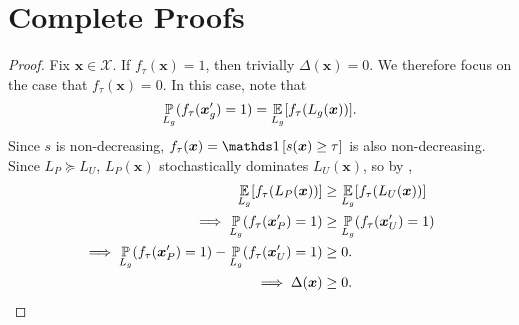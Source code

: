             

\section{Complete Proofs}
    \label{sec: appendix proof}

\theoremOne*
    \begin{proof}
        Fix \(\bm{x} \in \mathcal{X}\). If \(f_\tau(\bm{x}) = 1\), then trivially \(\Delta(\bm{x}) = 0\). We therefore focus on the case that \(f_\tau(\bm{x}) = 0\). In this case, note that
        \begin{equation*}
            \operatorname*{\mathbb{P}}_{L_g}(f_\tau(\bm{x}'_g) = 1) = \operatorname*{\mathbb{E}}_{L_g}[f_\tau(L_g(\bm{x}))]. 
        \end{equation*}
        Since \(s\) is non-decreasing, \(f_\tau(\bm{x}) = \one[s(\bm{x}) \geq \tau]\) is also non-decreasing. Since \(L_P \succeq L_U\), \(L_P(\bm{x})\) stochastically dominates \(L_U(\bm{x})\), so by ,
        \begin{align*}
            \operatorname*{\mathbb{E}}_{L_g}[f_\tau(L_P(\bm{x}))] &\geq \operatorname*{\mathbb{E}}_{L_g}[f_\tau(L_U(\bm{x}))] 
        \\  \implies
            \operatorname*{\mathbb{P}}_{L_g}(f_\tau(\bm{x}'_P) = 1) &\geq 
            \operatorname*{\mathbb{P}}_{L_g}(f_\tau(\bm{x}'_U) = 1)
        \\  \implies
            \operatorname*{\mathbb{P}}_{L_g}(f_\tau(\bm{x}'_P) = 1)- \operatorname*{\mathbb{P}}_{L_g}(f_\tau(\bm{x}'_U) = 1)&\geq 0.
        \\  \implies
            \Delta(\bm{x}) &\geq 0.
            \qedhere
        \end{align*}
    \end{proof}


